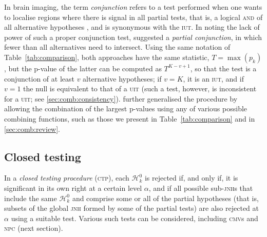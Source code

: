 In brain imaging, the term \emph{conjunction} refers to a test performed when one wants to localise regions where there is signal in all partial tests, that is, a logical \textsc{and} of all alternative hypotheses \citep{Nichols2005}, and is synonymous with the \textsc{iut}. In noting the lack of power of such a proper conjunction test, \citet{Friston2005} suggested a \emph{partial conjunction}, in which fewer than all alternatives need to intersect. Using the same notation of Table~\ref{tab:comparison}, both approaches have the same statistic, $T = \max \left(p_{k}\right)$, but the p-value of the latter can be computed as $T^{K-v+1}$, so that the test is a conjunction of at least $v$ alternative hypotheses; if $v=K$, it is an \textsc{iut}, and if $v=1$ the null is equivalent to that of a \textsc{uit} (such a test, however, is inconsistent for a \textsc{uit}; see \ref{sec:comb:consistency}). \citet{Benjamini2008} further generalised the procedure by allowing the combination of the largest p-values using any of various possible combining functions, such as those we present in Table~\ref{tab:comparison} and in \ref{sec:comb:review}.

\subsection{Closed testing}
\label{sec:comb:ctp}

In a \emph{closed testing procedure} (\textsc{ctp}), each $\mathcal{H}^0_k$ is rejected if, and only if, it is significant in its own right at a certain level $\alpha$, and if all possible sub-\textsc{jnh}s that include the same $\mathcal{H}^0_k$ and comprise some or all of the partial hypotheses (that is, subsets of the global \textsc{jnh} formed by some of the partial tests) are also rejected at $\alpha$ using a suitable test. Various such tests can be considered, including \textsc{cmv}s and \textsc{npc} (next section).

